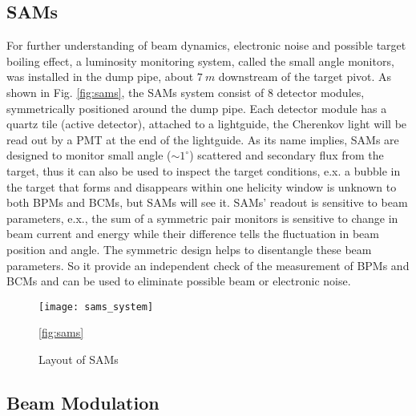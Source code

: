 \subsection{SAMs}
For further understanding of beam dynamics, electronic noise and possible target boiling
effect, a luminosity monitoring system, called the small angle monitors, was
installed in the dump pipe, about $7\ m$ downstream of the target pivot. As shown
in Fig. \ref{fig:sams}, the SAMs system consist of 8 detector modules, symmetrically 
positioned around the dump pipe. Each detector module has a quartz tile (active 
detector), attached to a lightguide, the Cherenkov light will be read out by a 
PMT at the end of the lightguide. 
As its name implies, SAMs are designed to monitor small angle ($\sim 1^\circ$)
scattered and secondary flux from the target, thus it can also be used to
inspect the target conditions, e.x. a bubble in the target that forms and disappears
within one helicity window is unknown to both BPMs and BCMs, but SAMs will see it.
SAMs' readout is sensitive to beam parameters,
e.x., the sum of a symmetric pair monitors is sensitive to change in beam current
and energy while their difference tells the fluctuation in beam position and angle.
The symmetric design helps to disentangle these beam parameters. So it provide
an independent check of the measurement of BPMs and BCMs and can be used to eliminate
possible beam or electronic noise.

\begin{figure}
    \centering
    \texttt{[image: sams\_system]}
    \caption{Layout of SAMs\cite{AJZ_thesis}}
    \ref{fig:sams}
\end{figure}

\subsection{Beam Modulation}
\begin{comment}
It is very important for PVES to control the systematic uncertainty, especially
the one from beam fluctuation (HCBA). Ideally, the electrons bunches with opposite
polarization should have exactly the same intensity and energy, hitting the target 
at the same place with the same angle, which is obviously impossible in reality. 
So we need to correct the false asymmetry introduce by the beam fluctuation. There are a
few methods to do the correction, one of them is the so called Beam modulation.
The idea is to introduce man-made fluctuations to the beam through the 
modulation system, then we can measure the changes in monitors and detectors 
to find the sensitivities of detectors to changes in energy, position and angle,
which will be used to correct the measured asymmetry.
\end{comment}

